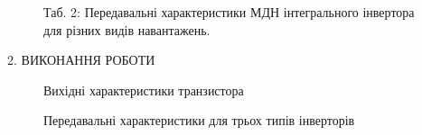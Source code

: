 \documentclass[a4paper,14pt]{extreport}
\begin{document}
\vspace{1cm}

\begin{figure}[h]
Таб. 2: Передавальні характеристики МДН інтегрального інвертора для різних видів навантажень.
\end{figure}
\clearpage


\newpage
\begin{center}2. ВИКОНАННЯ РОБОТИ\\ \end{center}

  \begin{figure}[h]
  \caption{Вихідні характеристики транзистора}
  \end{figure}

\vspace{1cm}


\begin{figure}[h]
\caption{Передавальні характеристики для трьох типів інверторів}
\end{figure}
\end{document}
